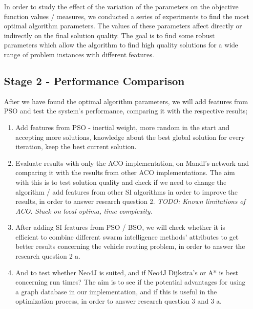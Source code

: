 In order to study the effect of the variation of the parameters on the objective function values / measures, we conducted a series of experiments to find the most optimal algorithm parameters. The values of these parameters affect directly or indirectly on the final solution quality. The goal is to find some robust parameters which allow the algorithm to find high quality solutions for a wide range of problem instances with different features. 

\subsection{Stage 2 - Performance Comparison}

After we have found the optimal algorithm parameters, we will add features from PSO and test the system's performance, comparing it with the respective results;

\begin{enumerate}

\item Add features from PSO - inertial weight, more random in the start and accepting more solutions, knowledge about the best global solution for every iteration, keep the best current solution.

\item Evaluate results with only the ACO implementation, on Mandl's network and comparing it with the results from other ACO implementations. The aim with this is to test solution quality and check if we need to change the algorithm / add features from other SI algorithms in order to improve the results, in order to answer research question 2. \emph{\color{red} TODO: Known limitations of ACO. Stuck on local optima, time complexity.}

\item After adding SI features from PSO / BSO, we will check whether it is efficient to combine different swarm intelligence methods' attributes to get better results concerning the vehicle routing problem, in order to answer the research question 2 a.

\item And to test whether Neo4J is suited, and if Neo4J Dijkstra's or A* is best concerning run times? The aim is to see if the potential advantages for using a graph database in our implementation, and if this is useful in the optimization process, in order to answer research question 3 and 3 a.

\end{enumerate}

